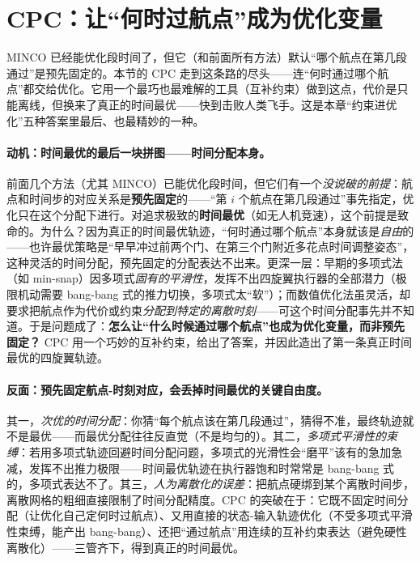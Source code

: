 \section{CPC：让“何时过航点”成为优化变量}
\label{sec:st-cpc}

\begin{note}
MINCO 已经能优化段时间了，但它（和前面所有方法）默认“哪个航点在第几段通过”是预先固定的。本节的 CPC 走到这条路的尽头——连“何时通过哪个航点”都交给优化。它用一个最巧也最难解的工具（互补约束）做到这点，代价是只能离线，但换来了真正的时间最优——快到击败人类飞手。这是本章“约束进优化”五种答案里最后、也最精妙的一种。
\end{note}

\paragraph{动机：时间最优的最后一块拼图——时间分配本身。}
前面几个方法（尤其 MINCO）已能优化段时间，但它们有一个\emph{没说破的前提}：航点和时间步的对应关系是\textbf{预先固定}的——“第 $i$ 个航点在第几段通过”事先指定，优化只在这个分配下进行。对追求极致的\textbf{时间最优}（如无人机竞速），这个前提是致命的。为什么？因为真正的时间最优轨迹，“何时通过哪个航点”本身就该是\emph{自由}的——也许最优策略是“早早冲过前两个门、在第三个门附近多花点时间调整姿态”，这种灵活的时间分配，预先固定的分配表达不出来。更深一层：早期的多项式法（如 min-snap）因多项式\emph{固有的平滑性}，发挥不出四旋翼执行器的全部潜力（极限机动需要 bang-bang 式的推力切换，多项式太“软”）；而数值优化法虽灵活，却要求把航点作为代价或约束\emph{分配到特定的离散时刻}——可这个时间分配事先并不知道。于是问题成了：\textbf{怎么让“什么时候通过哪个航点”也成为优化变量，而非预先固定？} CPC 用一个巧妙的互补约束，给出了答案，并因此造出了第一条真正时间最优的四旋翼轨迹。

\paragraph{反面：预先固定航点-时刻对应，会丢掉时间最优的关键自由度。}
其一，\emph{次优的时间分配}：你猜“每个航点该在第几段通过”，猜得不准，最终轨迹就不是最优——而最优分配往往反直觉（不是均匀的）。其二，\emph{多项式平滑性的束缚}：若用多项式轨迹回避时间分配问题，多项式的光滑性会“磨平”该有的急加急减，发挥不出推力极限——时间最优轨迹在执行器饱和时常常是 bang-bang 式的，多项式表达不了。其三，\emph{人为离散化的误差}：把航点硬绑到某个离散时间步，离散网格的粗细直接限制了时间分配精度。CPC 的突破在于：它既不固定时间分配（让优化自己定何时过航点）、又用直接的状态-输入轨迹优化（不受多项式平滑性束缚，能产出 bang-bang）、还把“通过航点”用连续的互补约束表达（避免硬性离散化）——三管齐下，得到真正的时间最优。

